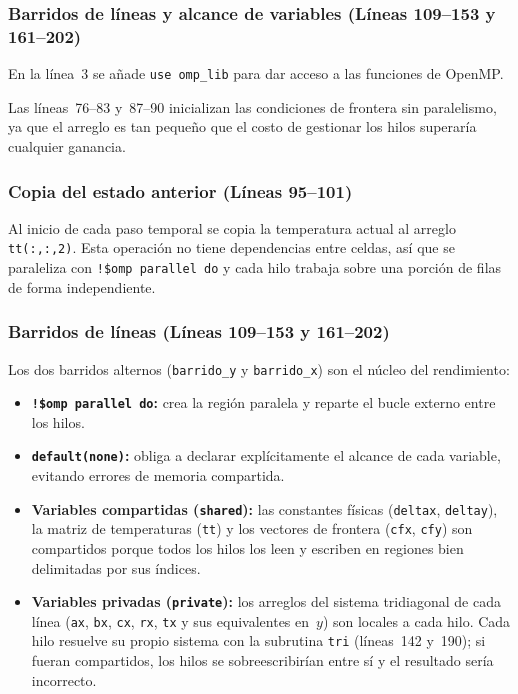 \documentclass[12pt,twocolumn]{article}
\begin{document}
\subsubsection*{Barridos de líneas y alcance de variables (Líneas 109--153 y 161--202)}

En la línea~3 se añade \texttt{use omp\_lib} para dar acceso a las funciones de OpenMP.

Las líneas~76--83 y~87--90 inicializan las condiciones de frontera sin paralelismo,
ya que el arreglo es tan pequeño que el costo de gestionar los hilos superaría cualquier ganancia.

\subsubsection*{Copia del estado anterior (Líneas 95--101)}

Al inicio de cada paso temporal se copia la temperatura actual al arreglo \texttt{tt(:,:,2)}.
Esta operación no tiene dependencias entre celdas, así que se paraleliza con
\texttt{!\$omp parallel do} y cada hilo trabaja sobre una porción de filas de forma independiente.

\subsubsection*{Barridos de líneas (Líneas 109--153 y 161--202)}

Los dos barridos alternos (\texttt{barrido\_y} y \texttt{barrido\_x}) son el núcleo del rendimiento:

\begin{itemize}
    \item \textbf{\texttt{!\$omp parallel do}:} crea la región paralela y reparte el bucle externo entre los hilos.
    \item \textbf{\texttt{default(none)}:} obliga a declarar explícitamente el alcance de cada variable, evitando errores de memoria compartida.
    \item \textbf{Variables compartidas (\texttt{shared}):} las constantes físicas (\texttt{deltax}, \texttt{deltay}), la matriz de temperaturas (\texttt{tt}) y los vectores de frontera (\texttt{cfx}, \texttt{cfy}) son compartidos porque todos los hilos los leen y escriben en regiones bien delimitadas por sus índices.
    \item \textbf{Variables privadas (\texttt{private}):} los arreglos del sistema tridiagonal de cada línea (\texttt{ax}, \texttt{bx}, \texttt{cx}, \texttt{rx}, \texttt{tx} y sus equivalentes en~$y$) son locales a cada hilo. Cada hilo resuelve su propio sistema con la subrutina \texttt{tri} (líneas~142 y~190); si fueran compartidos, los hilos se sobreescribirían entre sí y el resultado sería incorrecto.
\end{itemize}
\end{document}
